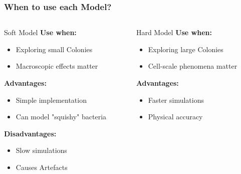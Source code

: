 \documentclass[10pt,t]{beamer}
\begin{document}
\begin{frame}
    \frametitle{When to use each Model?}

    \vspace{-0.55cm}

    \begin{columns}
        \begin{column}{0.5\textwidth}
            \begin{alertblock}{Soft Model}
                \textbf{Use when:}
                \begin{itemize}
                    \item Exploring small Colonies
                    \item Macroscopic effects matter
                \end{itemize}

                \textbf{Advantages:}
                \begin{itemize}
                    \item Simple implementation
                    \item Can model "squishy" bacteria
                \end{itemize}

                \textbf{Disadvantages:}
                \begin{itemize}
                    \item Slow simulations
                    \item Causes Artefacts
                \end{itemize}
            \end{alertblock}
        \end{column}
        \begin{column}{0.5\textwidth}
            \begin{exampleblock}{Hard Model }
                \textbf{Use when:}
                \begin{itemize}
                    \item Exploring large Colonies
                    \item Cell-scale phenomena matter
                \end{itemize}

                \textbf{Advantages:}
                \begin{itemize}
                    \item Faster simulations
                    \item Physical accuracy
                \end{itemize}


\end{exampleblock}
\end{column}
\end{columns}
\end{frame}
\end{document}
